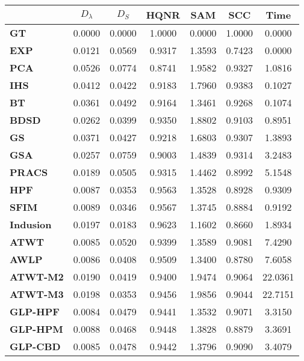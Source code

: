 \begin{tabular}{|l|c|c|c|c|c|c|}
\hline
&\textbf{$D_{\lambda}$}&\textbf{$D_{S}$}&\textbf{HQNR}&\textbf{SAM}&\textbf{SCC}&\textbf{Time}\\\hline
\textbf{GT}&0.0000&0.0000&1.0000&0.0000&1.0000&0.0000\\\hline
\textbf{EXP}&0.0121&0.0569&0.9317&1.3593&0.7423&0.0000\\\hline
\textbf{PCA}&0.0526&0.0774&0.8741&1.9582&0.9327&1.0816\\\hline
\textbf{IHS}&0.0412&0.0422&0.9183&1.7960&0.9383&0.1027\\\hline
\textbf{BT}&0.0361&0.0492&0.9164&1.3461&0.9268&0.1074\\\hline
\textbf{BDSD}&0.0262&0.0399&0.9350&1.8802&0.9103&0.8951\\\hline
\textbf{GS}&0.0371&0.0427&0.9218&1.6803&0.9307&1.3893\\\hline
\textbf{GSA}&0.0257&0.0759&0.9003&1.4839&0.9314&3.2483\\\hline
\textbf{PRACS}&0.0189&0.0505&0.9315&1.4462&0.8992&5.1548\\\hline
\textbf{HPF}&0.0087&0.0353&0.9563&1.3528&0.8928&0.9309\\\hline
\textbf{SFIM}&0.0089&0.0346&0.9567&1.3745&0.8884&0.9192\\\hline
\textbf{Indusion}&0.0197&0.0183&0.9623&1.1602&0.8660&1.8934\\\hline
\textbf{ATWT}&0.0085&0.0520&0.9399&1.3589&0.9081&7.4290\\\hline
\textbf{AWLP}&0.0086&0.0408&0.9509&1.3400&0.8780&7.6058\\\hline
\textbf{ATWT-M2}&0.0190&0.0419&0.9400&1.9474&0.9064&22.0361\\\hline
\textbf{ATWT-M3}&0.0198&0.0353&0.9456&1.9856&0.9044&22.7151\\\hline
\textbf{GLP-HPF}&0.0084&0.0479&0.9441&1.3532&0.9071&3.3150\\\hline
\textbf{GLP-HPM}&0.0088&0.0468&0.9448&1.3828&0.8879&3.3691\\\hline
\textbf{GLP-CBD}&0.0085&0.0478&0.9442&1.3796&0.9090&3.4079\\\hline
\end{tabular}
